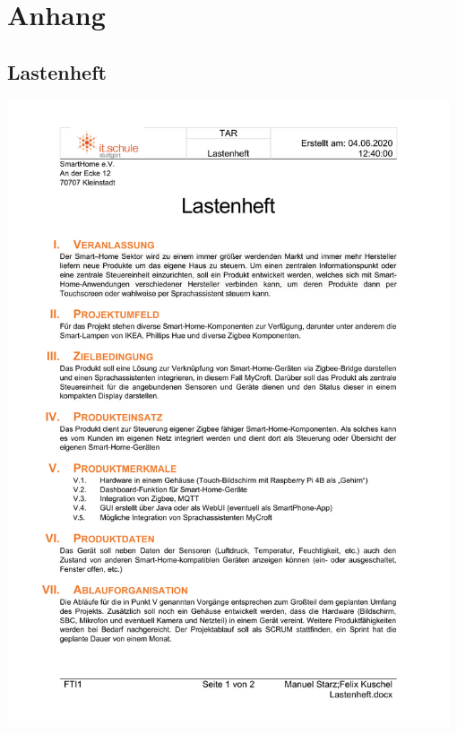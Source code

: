 \documentclass[12pt,a4paper]{article}
\begin{document}
 	\section{Anhang}
 	\subsection{Lastenheft}
 	\includegraphics[width=0.98\textwidth, page=1]{lastenheft.pdf}
 	\newpage
\end{document}
